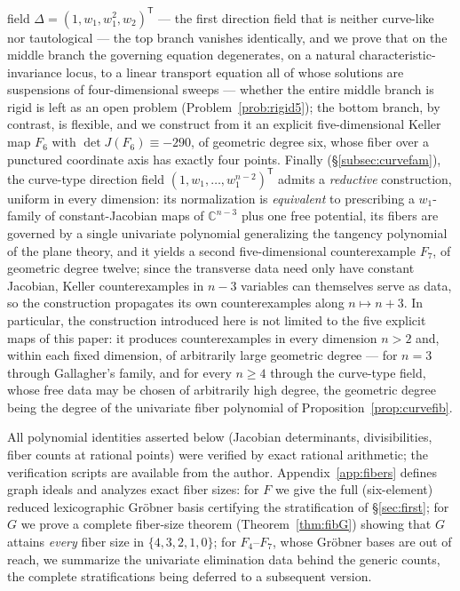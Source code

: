 \documentclass[11pt]{article}
\theoremstyle{plain}
\theoremstyle{definition}
\theoremstyle{remark}
\newcommand{\C}{\mathbb{C}}
\begin{document}
field $\Delta=(1,w_1,w_1^2,w_2)^{\mathsf T}$ --- the first direction field that is
neither curve-like nor tautological --- the top branch vanishes identically,
and we prove that on the middle branch the governing equation degenerates,
on a natural characteristic-invariance locus, to a linear transport equation all
of whose solutions are suspensions of four-dimensional sweeps --- whether the
entire middle branch is rigid is left as an open problem
(Problem~\ref{prob:rigid5}); the bottom
branch, by contrast, is flexible, and we construct from it an explicit
five-dimensional Keller map $F_6$ with $\det J(F_6)\equiv-290$, of geometric
degree six, whose fiber over a punctured coordinate axis has exactly four
points. Finally (\S\ref{subsec:curvefam}), the curve-type
direction field $(1,w_1,\dots,w_1^{n-2})^{\mathsf T}$ admits a \emph{reductive}
construction, uniform in every dimension: its normalization is
\emph{equivalent} to prescribing a
$w_1$-family of constant-Jacobian maps of $\C^{n-3}$ plus one free potential,
its fibers are governed by a single univariate polynomial generalizing the
tangency polynomial of the plane theory, and it yields a second
five-dimensional counterexample $F_7$, of geometric degree twelve; since the
transverse data need only have constant Jacobian, Keller counterexamples in
$n-3$ variables can themselves serve as data, so the construction propagates
its own counterexamples along $n\mapsto n+3$. In particular, the construction
introduced here is not limited to the five explicit maps of this paper: it
produces counterexamples in every dimension $n>2$ and, within each fixed
dimension, of arbitrarily large geometric degree --- for $n=3$ through
Gallagher's family, and for every $n\ge4$ through the curve-type field, whose
free data may be chosen of arbitrarily high degree, the geometric degree being
the degree of the univariate fiber polynomial of
Proposition~\ref{prop:curvefib}.

All polynomial identities asserted below (Jacobian determinants, divisibilities,
fiber counts at rational points) were verified by exact rational arithmetic; the
verification scripts are available from the author. Appendix~\ref{app:fibers}
defines graph ideals and analyzes exact fiber sizes: for $F$ we give the full
(six-element) reduced lexicographic Gr\"obner basis certifying the stratification
of \S\ref{sec:first}; for $G$ we prove a complete fiber-size theorem
(Theorem~\ref{thm:fibG}) showing that $G$ attains \emph{every} fiber size in
$\{4,3,2,1,0\}$; for $F_4$--$F_7$, whose Gr\"obner bases are out of reach, we
summarize the univariate elimination data behind the generic counts, the
complete stratifications being deferred to a subsequent version.
\end{document}
